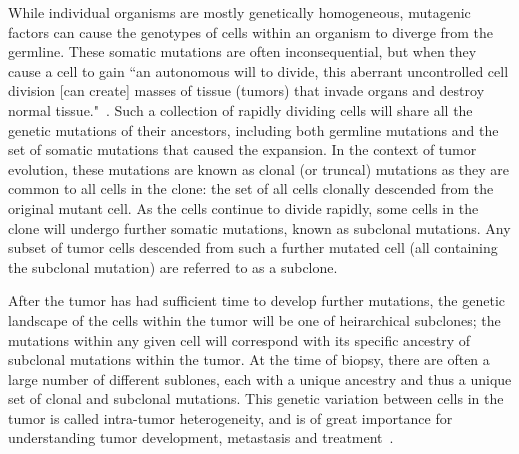 \documentclass[../../main.tex]{subfiles}
\begin{document}
While individual organisms are mostly genetically homogeneous, mutagenic factors can cause the genotypes of cells within an organism to diverge from the germline.
These somatic mutations are often inconsequential, but when they cause a cell to gain ``an autonomous will to divide, this aberrant uncontrolled cell division [can create] masses of tissue (tumors) that invade organs and destroy normal tissue."~\cite{EmperorMaladies}. 
Such a collection of rapidly dividing cells will share all the genetic mutations of their ancestors, including both germline mutations and the set of somatic mutations that caused the expansion.
In the context of tumor evolution, these mutations are known as clonal (or truncal) mutations as they are common to all cells in the clone: the set of all cells clonally descended from the original mutant cell.
As the cells continue to divide rapidly, some cells in the clone will undergo further somatic mutations, known as subclonal mutations.
Any subset of tumor cells descended from such a further mutated cell (all containing the subclonal mutation) are referred to as a subclone.

After the tumor has had sufficient time to develop further mutations, the genetic landscape of the cells within the tumor will be one of heirarchical subclones; the mutations within any given cell will correspond with its specific ancestry of subclonal mutations within the tumor.
At the time of biopsy, there are often a large number of different sublones, each with a unique ancestry and thus a unique set of clonal and subclonal mutations.
This genetic variation between cells in the tumor is called intra-tumor heterogeneity, and is of great importance for understanding tumor development, metastasis and treatment~\cite{metastatic}.


\end{document}
